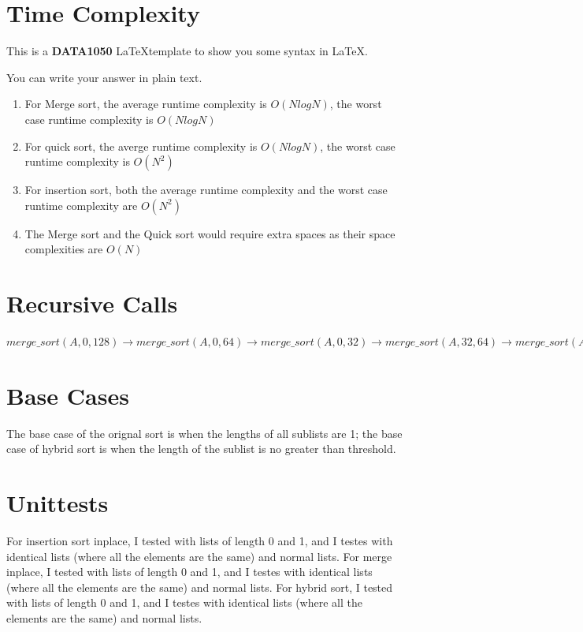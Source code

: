 \documentclass[12pt,letterpaper]{article}
\begin{document}
\section{Time Complexity}
This is a \textbf{DATA1050} \LaTeX template to show you some syntax in LaTeX.

You can write your answer in plain text.

\begin{enumerate}
    \item For Merge sort, the average runtime complexity is $O(NlogN)$, the worst case runtime complexity is $O(NlogN)$
    
    \item For quick sort, the averge runtime complexity is $O(NlogN)$, the worst case runtime complexity is $O(N^2)$
    
    \item For insertion sort, both the average runtime complexity and the worst case runtime complexity are $O(N^2)$
    \item The Merge sort and the Quick sort would require extra spaces as their space complexities are $O(N)$
    
\end{enumerate}

\pagebreak
\section{Recursive Calls}
$merge\_sort(A, 0, 128) \rightarrow merge\_sort(A, 0, 64) \rightarrow merge\_sort(A, 0, 32) \rightarrow merge\_sort(A, 32, 64) \rightarrow merge\_sort(A, 64, 128) \rightarrow merge\_sort(A, 64, 96) \rightarrow merge\_sort(A, 96, 128)$
\pagebreak
\section{Base Cases}
The base case of the orignal sort is when the lengths of all sublists are 1; the base case of hybrid sort is when the length of the sublist is no greater than threshold.
\pagebreak
\section{Unittests}
For insertion sort inplace, I tested with lists of length 0 and 1, and I testes with identical lists (where all the elements are the same) and normal lists.\newline
For merge inplace, I tested with lists of length 0 and 1, and I testes with identical lists (where all the elements are the same) and normal lists.\newline
For hybrid sort, I tested with lists of length 0 and 1, and I testes with identical lists (where all the elements are the same) and normal lists.\newline
 
\end{document}
